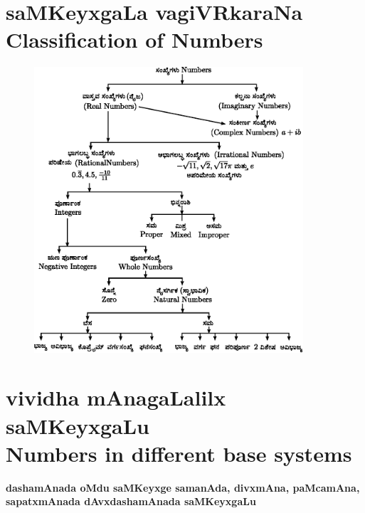 \vfill
\eject
\section*{saMKeyxgaLa vagiVRkaraNa \\{\rm\bfseries Classification of Numbers}}
\begin{figure}[h]
\begin{center}
\includegraphics[width=10cm]{src/figure/165.eps}
\end{center}
\end{figure}

\eject
\section*{vividha mAnagaLalilx saMKeyxgaLu\\{\rm\bfseries Numbers in different base systems}}

\textbf{dashamAnada oMdu saMKeyxge samanAda, divxmAna, paMcamAna, sapatxmAnada dAvxdashamAnada saMKeyxgaLu}

